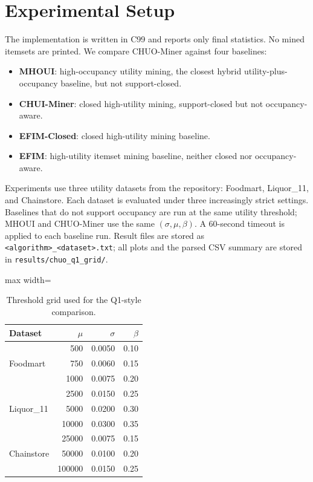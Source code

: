 \documentclass[11pt,a4paper]{article}
\begin{document}
\section{Experimental Setup}

The implementation is written in C99 and reports only final statistics. No mined itemsets are printed. We compare CHUO-Miner against four baselines:
\begin{itemize}
    \item \textbf{MHOUI}: high-occupancy utility mining, the closest hybrid utility-plus-occupancy baseline, but not support-closed.
    \item \textbf{CHUI-Miner}: closed high-utility mining, support-closed but not occupancy-aware.
    \item \textbf{EFIM-Closed}: closed high-utility mining baseline.
    \item \textbf{EFIM}: high-utility itemset mining baseline, neither closed nor occupancy-aware.
\end{itemize}

Experiments use three utility datasets from the repository: Foodmart, Liquor\_11, and Chainstore. Each dataset is evaluated under three increasingly strict settings. Baselines that do not support occupancy are run at the same utility threshold; MHOUI and CHUO-Miner use the same \((\sigma,\mu,\beta)\). A 60-second timeout is applied to each baseline run. Result files are stored as \texttt{<algorithm>\_<dataset>.txt}; all plots and the parsed CSV summary are stored in \texttt{results/chuo\_q1\_grid/}.

\begin{table}[H]
\centering
\caption{Threshold grid used for the Q1-style comparison.}
\label{tab:grid}
\small
\begin{adjustbox}{max width=\textwidth}
\begin{tabular}{lrrr}
\toprule
Dataset & \(\mu\) & \(\sigma\) & \(\beta\) \\
\midrule
\multirow{3}{*}{Foodmart}
& 500 & 0.0050 & 0.10 \\
& 750 & 0.0060 & 0.15 \\
& 1000 & 0.0075 & 0.20 \\
\midrule
\multirow{3}{*}{Liquor\_11}
& 2500 & 0.0150 & 0.25 \\
& 5000 & 0.0200 & 0.30 \\
& 10000 & 0.0300 & 0.35 \\
\midrule
\multirow{3}{*}{Chainstore}
& 25000 & 0.0075 & 0.15 \\
& 50000 & 0.0100 & 0.20 \\
& 100000 & 0.0150 & 0.25 \\
\bottomrule
\end{tabular}
\end{adjustbox}
\end{table}
\end{document}
